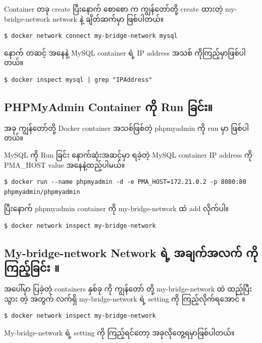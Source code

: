 \documentclass{article}
\begin{document}
Container တခု create ပြီးနောက် စောစော က ကျွန်တော်တို့ create ထားတဲ့
my-bridge-network network နဲ့ ချိတ်ဆက်မှာ ဖြစ်ပါတယ်။

\begin{verbatim}
$ docker network connect my-bridge-network mysql
\end{verbatim}

နောက် တဆင့် အနေနဲ့ MySQL container ရဲ့ IP address အသစ်
ကိုကြည့်မှာဖြစ်ပါတယ်။

\begin{verbatim}
$ docker inspect mysql | grep "IPAddress"
\end{verbatim}

\subsection{PHPMyAdmin Container ကို Run
ခြင်း။}\label{phpmyadmin-container-ux1000-run-ux1001ux1004}

အခု ကျွန်တော်တို့ Docker container အသစ်ဖြစ်တဲ့ phpmyadmin ကို run မှာ
ဖြစ်ပါတယ်။

MySQL ကို Run ခြင်း နောက်ဆုံးအဆင့်မှာ ရခဲ့တဲ့ MySQL container IP address
ကို PMA\_HOST value အနေနဲ့ထည့်ပါမယ်။

\begin{verbatim}
$ docker run --name phpmyadmin -d -e PMA_HOST=172.21.0.2 -p 8080:80 phpmyadmin/phpmyadmin
\end{verbatim}

ပြီးနောက် phpmyadmin container ကို my-bridge-network ထဲ add လိုက်ပါ။

\begin{verbatim}
$ docker network inspect my-bridge-network
\end{verbatim}

\subsection{My-bridge-network Network ရဲ့ အချက်အလက် ကိုကြည့်ခြင်း
။}\label{my-bridge-network-network-ux101b-ux1021ux1001ux1000ux1021ux101cux1000-ux1000ux1000ux100aux1001ux1004}

အပေါ်မှာ ပြခဲ့တဲ့ containers နှစ်ခု ကို ကျွန်တော် တို့ my-bridge-network
ထဲ ထည့်ပြီးသွား တဲ့ အတွက် လက်ရှိ my-bridge-network ရဲ့ setting ကို
ကြည့်လိုက်ရအောင် ။

\begin{verbatim}
$ docker network inspect my-bridge-network
\end{verbatim}

My-bridge-network ရဲ့ setting ကို ကြည့်ရင်တော့ အခုလိုတွေ့ရမှာဖြစ်ပါတယ်။
\end{document}
